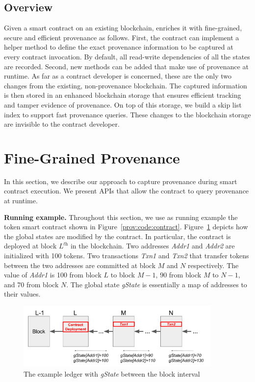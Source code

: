 \subsection{\fs Overview}
Given a smart contract on an existing blockchain, {\fs} enriches it with fine-grained, secure and
efficient provenance as follows. First, the contract can implement a helper
method to define the exact provenance information to be captured at every contract invocation. By default, all
read-write dependencies of all the states are recorded. Second, new methods can be added that make use of
provenance at runtime. As far as a contract developer is concerned, these are the only two changes from the
existing, non-provenance blockchain. The captured information is then stored in an enhanced blockchain storage
that ensures efficient tracking and tamper evidence of provenance.  On top of this storage, we build a skip
list index to support fast provenance queries.  These changes to the blockchain storage are invisible to the
contract developer.    


\section{Fine-Grained Provenance}
\label{prov:sec:capture}
In this section, we describe our approach to capture provenance during smart contract execution. We present
APIs that allow the contract to query provenance at runtime. 

\textbf{Running example.} Throughout this section, we use as running example the token smart contract  
shown in Figure~\ref{prov:code:contract}. Figure~\ref{diagram:prov:ledger} depicts how the global states are modified by the contract. In particular, the contract is deployed at block $L^\textit{th}$ in the blockchain. Two addresses
\textit{Addr1} and \textit{Addr2} are initialized with 100 tokens. Two transactions \textit{Txn1} and
\textit{Txn2} that transfer tokens between the two addresses are committed at block $M$ and $N$ respectively.
The value of \textit{Addr1} is 100 from block $L$ to block $M-1$, $90$ from block $M$ to $N-1$, and 70
from block $N$. The global state {\em gState} is essentially a map of addresses to their values. 

\begin{figure}
  \centering
  \includegraphics[width=0.9\textwidth]{diagram/provenance/contract.pdf}
  \caption{The example ledger with \textit{gState} between the block interval}
  \label{diagram:prov:ledger}
\end{figure}


